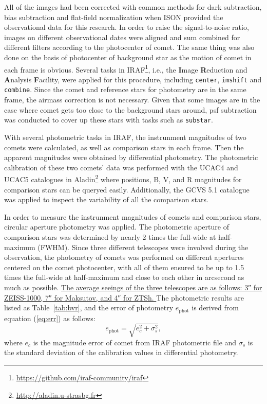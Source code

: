 All of the images had been corrected with common methods for dark subtraction, bias subtraction and flat-field normalization when ISON provided the observational data for this research. In order to raise the signal-to-noise ratio, images on different observational dates were aligned and sum combined for different filters according to the photocenter of comet. The same thing was also done on the basis of photocenter of background star as the motion of comet in each frame is obvious. Several tasks in IRAF\footnote{\href{https://github.com/iraf-community/iraf}{https://github.com/iraf-community/iraf}}, i.e., the \textbf{I}mage \textbf{R}eduction and \textbf{A}nalysis \textbf{F}acility, were applied for this procedure, including \texttt{center}, \verb|imshift| and \verb|combine|. Since the comet and reference stars for photometry are in the same frame, the airmass correction is not necessary. Given that some images are in the case where comet gets too close to the background stars around, psf subtraction was conducted to cover up these stars with tasks such as \verb|substar|. 

With several photometric tasks in IRAF, the instrunment magnitudes of two comets were calculated, as well as comparison stars in each frame. Then the apparent magnitudes were obtained by differential photometry. The photometric calibration of these two comets' data was performed with the UCAC4 \citep{zacharias_fourth_2013} and UCAC5 \citep{zacharias_ucac5_2017} catalogues in 
Aladin\footnote{\href{http://aladin.u-strasbg.fr}{http://aladin.u-strasbg.fr}} 
where positions, B, V, and R magnitudes for comparison stars can be queryed easily. Additionally, the GCVS 5.1 \citep{samus_general_2017} catalogue was applied to inspect the variability of all the comparison stars. 

In order to measure the  instrunment magnitudes of comets and comparison stars, circular aperture photometry was applied. The photometric aperture of comparison stars was determined by nearly \si{\num{2}} times the full-wide at half-maximum (FWHM). Since three different telescopes were involved during the observation, the photometry of comets was performed on different apertures centered on the comet photocenter, with all of them ensured to be up to \si{\num{1.5}} times the full-wide at half-maximum and close to each other in arcsecond as much as possible. 
\ul{ %
    The average seeings of the three telescopes are as follows: \ang{;;3} for ZEISS-1000, \ang{;;7} for Maksutov, and \ang{;;4} for ZTSh. 
} 
The photometric results are listed as Table~\ref{tab:bvr}, and the error of photometry $e_{\mathrm{phot}}$ is derived from equation (\ref{eq:err}) as follows: 
\begin{equation}
    e_{\mathrm{phot}} = \sqrt{e_{c}^{2} + \sigma_s^2}, 
    \label{eq:err}
\end{equation}
where $e_c$ is the magnitude error of comet from IRAF photometric file and $\sigma_s$ is the standard deviation of the calibration values in differential photometry. 


